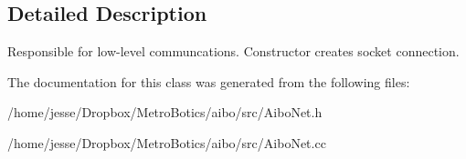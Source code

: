 \subsection{Detailed Description}
Responsible for low-\/level communcations. Constructor creates socket connection. 

The documentation for this class was generated from the following files:\begin{DoxyCompactItemize}
\item 
/home/jesse/Dropbox/MetroBotics/aibo/src/AiboNet.h\item 
/home/jesse/Dropbox/MetroBotics/aibo/src/AiboNet.cc\end{DoxyCompactItemize}
